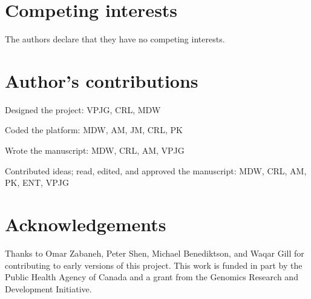 \documentclass[doublespacing, linenumbers]{bmcart}
\begin{document}
\begin{backmatter}

\section*{Competing interests}
  The authors declare that they have no competing interests.

\section*{Author's contributions}
Designed the project: VPJG, CRL, MDW

Coded the platform: MDW, AM, JM, CRL, PK

Wrote the manuscript: MDW, CRL, AM, VPJG

Contributed ideas; read, edited, and approved the manuscript: MDW, CRL, AM, PK, ENT, VPJG

\section*{Acknowledgements}
Thanks to Omar Zabaneh, Peter Shen, Michael Benediktson, and Waqar Gill for contributing to early versions of this project.  This work is funded in part by the Public Health Agency of Canada and a grant from the Genomics Research and Development Initiative.




\end{backmatter}
\end{document}

